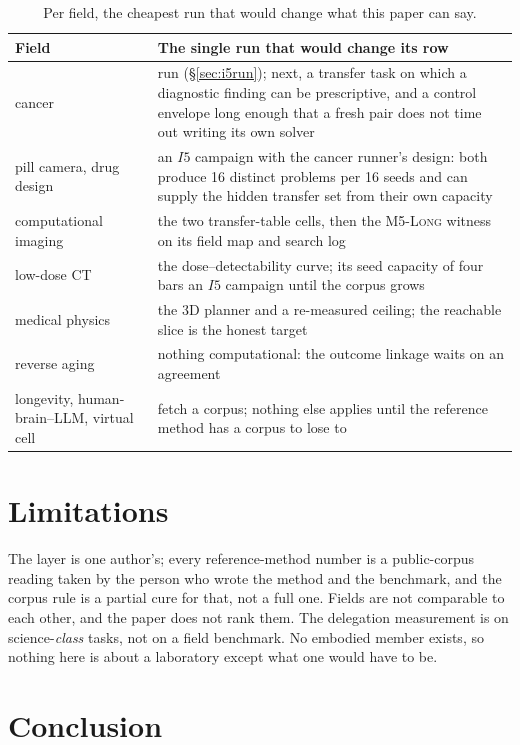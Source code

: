 \documentclass[11pt]{article}
\theoremstyle{definition}
\begin{document}
\begin{table}[!htbp]
\centering\small
\begin{tabularx}{\textwidth}{@{}lY@{}}
\toprule
Field & The single run that would change its row \\
\midrule
cancer & run (\S\ref{sec:i5run}); next, a transfer task on which a diagnostic finding can be prescriptive, and a control envelope long enough that a fresh pair does not time out writing its own solver \\
pill camera, drug design & an $I5$ campaign with the cancer runner's design: both produce 16 distinct problems per 16 seeds and can supply the hidden transfer set from their own capacity \\
computational imaging & the two transfer-table cells, then the \textsc{M5-Long} witness on its field map and search log \\
low-dose CT & the dose--detectability curve; its seed capacity of four bars an $I5$ campaign until the corpus grows \\
medical physics & the 3D planner and a re-measured ceiling; the reachable slice is the honest target \\
reverse aging & nothing computational: the outcome linkage waits on an agreement \\
longevity, human-brain--LLM, virtual cell & fetch a corpus; nothing else applies until the reference method has a corpus to lose to \\
\bottomrule
\end{tabularx}
\caption{Per field, the cheapest run that would change what this paper can say.}
\label{tab:next}
\end{table}

\section{Limitations}\label{sec:limits}

The layer is one author's; every reference-method number is a public-corpus reading taken by the person who wrote the method and the benchmark, and the corpus rule is a partial cure for that, not a full one. Fields are not comparable to each other, and the paper does not rank them. The delegation measurement is on science-\emph{class} tasks, not on a field benchmark. No embodied member exists, so nothing here is about a laboratory except what one would have to be.

\section{Conclusion}
\end{document}

